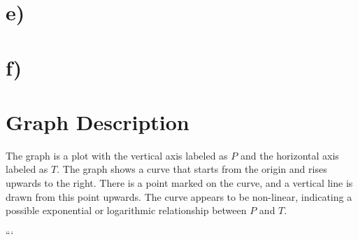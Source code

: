 

\section*{e)}
\section*{f)}

\section*{Graph Description}
The graph is a plot with the vertical axis labeled as \( P \) and the horizontal axis labeled as \( T \). The graph shows a curve that starts from the origin and rises upwards to the right. There is a point marked on the curve, and a vertical line is drawn from this point upwards. The curve appears to be non-linear, indicating a possible exponential or logarithmic relationship between \( P \) and \( T \).

```
